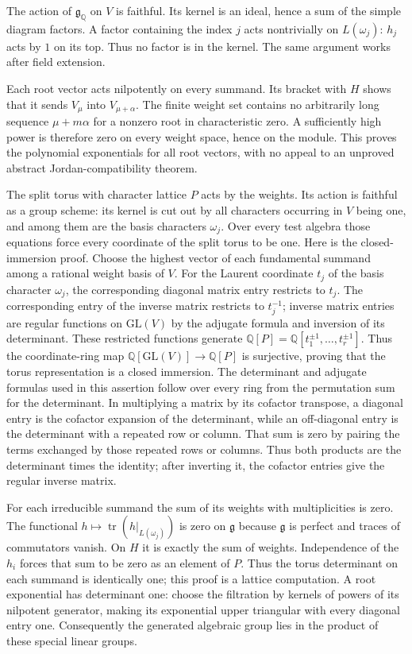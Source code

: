 \documentclass[11pt,a4paper,openany]{report}
\begin{document}
The action of \(\mathfrak g_{\mathbb Q}\) on \(V\) is faithful. Its kernel is an ideal, hence a sum of the simple diagram factors. A factor containing the index \(j\) acts nontrivially on \(L(\omega_j)\): \(h_j\) acts by \(1\) on its top. Thus no factor is in the kernel. The same argument works after field extension.

Each root vector acts nilpotently on every summand. Its bracket with \(H\) shows that it sends \(V_\mu\) into \(V_{\mu+\alpha}\). The finite weight set contains no arbitrarily long sequence \(\mu+m\alpha\) for a nonzero root in characteristic zero. A sufficiently high power is therefore zero on every weight space, hence on the module. This proves the polynomial exponentials for all root vectors, with no appeal to an unproved abstract Jordan-compatibility theorem.

The split torus with character lattice \(P\) acts by the weights. Its action is faithful as a group scheme: its kernel is cut out by all characters occurring in \(V\) being one, and among them are the basis characters \(\omega_j\). Over every test algebra those equations force every coordinate of the split torus to be one. Here is the closed-immersion proof. Choose the highest vector of each fundamental summand among a rational weight basis of \(V\). For the Laurent coordinate \(t_j\) of the basis character \(\omega_j\), the corresponding diagonal matrix entry restricts to \(t_j\). The corresponding entry of the inverse matrix restricts to \(t_j^{-1}\); inverse matrix entries are regular functions on \(\mathrm{GL}(V)\) by the adjugate formula and inversion of its determinant. These restricted functions generate \(\mathbb Q[P]=\mathbb Q[t_1^{\pm1},\ldots,t_r^{\pm1}]\). Thus the coordinate-ring map \(\mathbb Q[\mathrm{GL}(V)]\to\mathbb Q[P]\) is surjective, proving that the torus representation is a closed immersion. The determinant and adjugate formulas used in this assertion follow over every ring from the permutation sum for the determinant. In multiplying a matrix by its cofactor transpose, a diagonal entry is the cofactor expansion of the determinant, while an off-diagonal entry is the determinant with a repeated row or column. That sum is zero by pairing the terms exchanged by those repeated rows or columns. Thus both products are the determinant times the identity; after inverting it, the cofactor entries give the regular inverse matrix.

For each irreducible summand the sum of its weights with multiplicities is zero. The functional \(h\mapsto\operatorname{tr}(h|_{L(\omega_j)})\) is zero on \(\mathfrak g\) because \(\mathfrak g\) is perfect and traces of commutators vanish. On \(H\) it is exactly the sum of weights. Independence of the \(h_i\) forces that sum to be zero as an element of \(P\). Thus the torus determinant on each summand is identically one; this proof is a lattice computation. A root exponential has determinant one: choose the filtration by kernels of powers of its nilpotent generator, making its exponential upper triangular with every diagonal entry one. Consequently the generated algebraic group lies in the product of these special linear groups.
\end{document}
